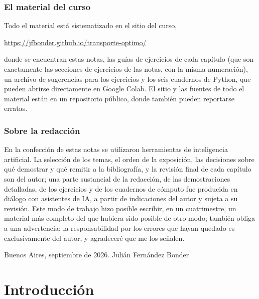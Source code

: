 \documentclass[12pt, a4paper]{amsbook}
\theoremstyle{remark}
\theoremstyle{definition}
\numberwithin{section}{chapter}
\numberwithin{subsection}{section}
\numberwithin{equation}{section}
\numberwithin{figure}{chapter}
\begin{document}
{\subsection*{El material del curso}

Todo el material está sistematizado en el sitio del curso,
\begin{center}
\url{https://jfbonder.github.io/transporte-optimo/}
\end{center}
donde se encuentran estas notas, las guías de ejercicios de cada capítulo
(que son exactamente las secciones de ejercicios de las notas, con la misma
numeración), un archivo de sugerencias para los ejercicios y los seis
cuadernos de Python, que pueden abrirse directamente en Google Colab. El
sitio y las fuentes de todo el material están en un repositorio público,
donde también pueden reportarse erratas.

\subsection*{Sobre la redacción}

En la confección de estas notas se utilizaron herramientas de inteligencia
artificial. La selección de los temas, el orden de la exposición, las
decisiones sobre qué demostrar y qué remitir a la bibliografía, y la revisión
final de cada capítulo son del autor; una parte sustancial de la redacción,
de las demostraciones detalladas, de los ejercicios y de los cuadernos de
cómputo fue producida en diálogo con asistentes de IA, a partir de
indicaciones del autor y sujeta a su revisión. Este modo de trabajo hizo
posible escribir, en un cuatrimestre, un material más completo del que
hubiera sido posible de otro modo; también obliga a una advertencia: la
responsabilidad por los errores que hayan quedado es exclusivamente del
autor, y agradeceré que me los señalen.
\enlargethispage{3.2\baselineskip}
\par\nobreak
\medskip
\nobreak
\noindent Buenos Aires, septiembre de 2026.
\hfill Julián Fernández Bonder
}
\cleardoublepage
\tableofcontents 


\chapter{Introducción}\label{cap.intro}
\end{document}
